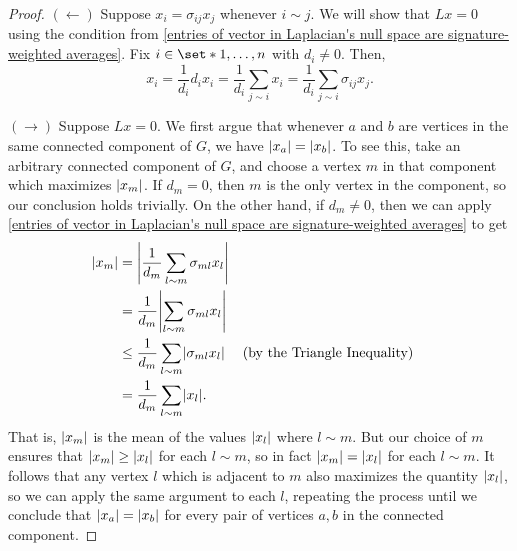 \documentclass[12pt]{article}
\theoremstyle{definition}
\DeclarePairedDelimiter\abs{\lvert}{\rvert}%
\begin{document}
\begin{proof}
$(\leftarrow)$ Suppose $x_i = \sigma_{ij}x_j$ whenever $i \sim j$. We will show that $Lx = 0$ using the condition from \cref{entries of vector in Laplacian's null space are signature-weighted averages}. Fix $i \in \set*{1, \dots, n}$ with $d_i \neq 0$. Then,
$$
x_i 
= \frac{1}{d_i} d_i x_i
= \frac{1}{d_i} \sum_{j \sim i} x_i
= \frac{1}{d_i} \sum_{j \sim i} \sigma_{ij}x_j.
$$ 

$(\rightarrow)$ Suppose $Lx = 0$. We first argue that whenever $a$ and $b$ are vertices in the same connected component of $G$, we have $\abs*{x_a} = \abs*{x_b}$. To see this, take an arbitrary connected component of $G$, and choose a vertex $m$ in that component which maximizes $\abs*{x_m}$. If $d_m = 0$, then $m$ is the only vertex in the component, so our conclusion holds trivially. On the other hand, if $d_m \neq 0$, then we can apply \cref{entries of vector in Laplacian's null space are signature-weighted averages} to get
\begin{align*}
\abs*{x_m} &= \abs*{\frac{1}{d_m} \sum_{l \sim m} \sigma_{ml} x_l} \\
&= \frac{1}{d_m} \abs*{\sum_{l \sim m} \sigma_{ml} x_l} \\
&\leq \frac{1}{d_m} \sum_{l \sim m} \abs*{\sigma_{ml} x_l} && \text{(by the Triangle Inequality)} \\
&= \frac{1}{d_m} \sum_{l \sim m} \abs*{x_l}.
\end{align*}
That is, $\abs*{x_m}$ is the mean of the values $\abs{x_l}$ where $l \sim m$. But our choice of $m$ ensures that $\abs*{x_m} \geq \abs*{x_l}$ for each $l \sim m$, so in fact $\abs*{x_m} = \abs*{x_l}$ for each $l \sim m$. It follows that any vertex $l$ which is adjacent to $m$ also maximizes the quantity $\abs*{x_l}$, so we can apply the same argument to each $l$, repeating the process until we conclude that $\abs*{x_a} = \abs*{x_b}$ for every pair of vertices $a, b$ in the connected component.


\end{proof}
\end{document}
